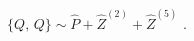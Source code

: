 \begin{equation} 
{} \{ Q , \, Q \} \sim \hat{P} + \hat{Z}^{(2)} + \hat{Z}^{(5)} \, \, . 
\end{equation}

